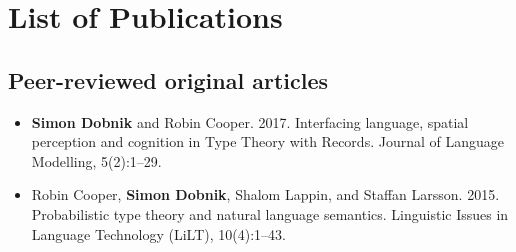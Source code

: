 \documentclass{article}
\begin{document}
\section*{List of Publications}






\subsection*{Peer-reviewed original articles}

\begin{itemize}
\item \textbf{Simon Dobnik} and Robin Cooper. 2017. Interfacing language, spatial perception and cognition in Type Theory with Records. Journal of Language Modelling, 5(2):1–29.



\item Robin Cooper, \textbf{Simon Dobnik}, Shalom Lappin, and Staffan Larsson. 2015. Probabilistic type theory and natural language semantics. Linguistic Issues in Language Technology (LiLT), 10(4):1–43.
\end{itemize}
\end{document}

